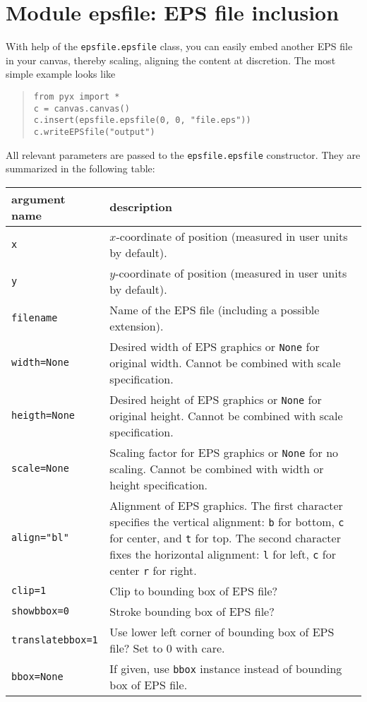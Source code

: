 \chapter{Module epsfile: EPS file inclusion}

With help of the \verb|epsfile.epsfile| class, you can easily embed
another EPS file in your canvas, thereby scaling, aligning the content
at discretion. The most simple example looks like
\begin{quote}
\begin{verbatim}
from pyx import *
c = canvas.canvas()
c.insert(epsfile.epsfile(0, 0, "file.eps"))
c.writeEPSfile("output")
\end{verbatim}
\end{quote}

All relevant parameters are passed to the \verb|epsfile.epsfile|
constructor. They are summarized in the following table:

\medskip
\begin{tabularx}{\linewidth}{l>{\raggedright\arraybackslash}X}
argument name&description\\
\hline
\texttt{x} & $x$-coordinate of position (measured in user
units by default).\\
\texttt{y} & $y$-coordinate of position (measured in user
units by default).\\
\texttt{filename} & Name of the EPS file (including a possible
extension).\\
\texttt{width=None} & Desired width of EPS graphics or \texttt{None}
for original width. Cannot be combined with scale specification.\\
\texttt{heigth=None} & Desired height of EPS graphics or \texttt{None}
for original height. Cannot be combined with scale specification.\\
\texttt{scale=None} & Scaling factor for EPS graphics or \texttt{None}
for no scaling. Cannot be combined with width or height specification.\\
\texttt{align="bl"} & Alignment of EPS graphics. The first character
specifies the vertical alignment: \texttt{b} for bottom, \texttt{c}
for center, and \texttt{t} for top. The second character fixes the
horizontal alignment: \texttt{l} for left, \texttt{c} for center
\texttt{r} for right.\\
\texttt{clip=1} & Clip to bounding box of EPS file?\\
\texttt{showbbox=0} & Stroke bounding box of EPS file?\\
\texttt{translatebbox=1} & Use lower left corner of bounding box of EPS
file? Set to $0$ with care.\\
\texttt{bbox=None} & If given, use \texttt{bbox} instance instead of
bounding box of EPS file.
\end{tabularx}



\label{epsfile}


